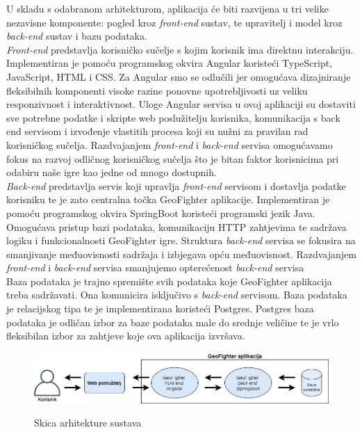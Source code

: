	\textnormal{U skladu s odabranom arhitekturom, aplikacija će biti razvijena u tri velike nezavisne komponente: pogled kroz \textit{front-end} sustav, te upravitelj i model kroz \textit{back-end} sustav i bazu podataka.}\\
	
	\textnormal{\textit{Front-end} predstavlja korisničko sučelje s kojim korisnik ima direktnu interakciju. Implementiran je pomoću programskog okvira Angular koristeći TypeScript, JavaScript, HTML i CSS. Za Angular smo se odlučili jer omogućava dizajniranje fleksibilnih komponenti visoke razine ponovne upotrebljivosti uz veliku responzivnost i interaktivnost. Uloge Angular servisa u ovoj aplikaciji su dostaviti sve potrebne podatke i skripte web poslužitelju korisnika, komunikacija s back end servisom i izvođenje vlastitih procesa koji su nužni za pravilan rad korisničkog sučelja. Razdvajanjem \textit{front-end} i \textit{back-end} servisa omogućavamo fokus na razvoj odličnog korisničkog sučelja što je bitan faktor korisnicima pri odabiru naše igre kao jedne od mnogo dostupnih.}\\
	
	\textnormal{\textit{Back-end} predstavlja servis koji upravlja \textit{front-end} servisom i dostavlja podatke korisniku te je zato centralna točka GeoFighter aplikacije. Implementiran je pomoću programskog okvira SpringBoot koristeći programski jezik Java. Omogućava pristup bazi podataka, komunikaciju HTTP zahtjevima te sadržava logiku i funkcionalnosti GeoFighter igre. Struktura \textit{back-end} servisa se fokusira na smanjivanje međuovisnosti sadržaja i izbjegava opću međuovisnost. Razdvajanjem \textit{front-end} i \textit{back-end} servisa smanjujemo opterećenost \textit{back-end} servisa}\\
	
	\textnormal{Baza podataka je trajno spremište svih podataka koje GeoFighter aplikacija treba sadržavati. Ona komunicira isključivo s \textit{back-end} servisom. Baza podataka je relacijskog tipa te je implementirana koristeći Postgres. Postgres baza podataka je odličan izbor za baze podataka male do srednje veličine te je vrlo fleksibilan izbor za zahtjeve koje ova aplikacija izvršava.}\\
	
	\begin{figure}[H]
		\centering
		\includegraphics[scale=0.5]{slike/strukturaGF} \\
		\caption{Skica arhitekture sustava}
		\label{fig:arhitekturaGF}
	\end{figure}
	
